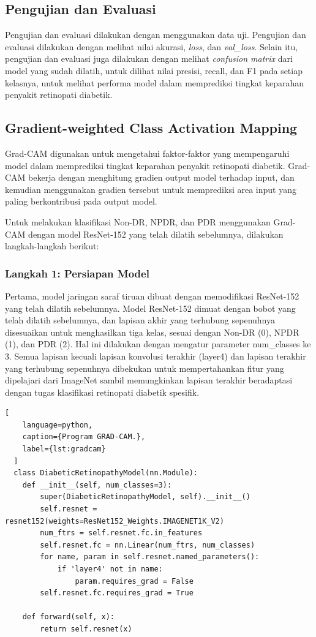 \subsection{Pengujian dan Evaluasi}
\label{sec:326}
Pengujian dan evaluasi dilakukan dengan menggunakan data uji. Pengujian dan evaluasi dilakukan dengan melihat nilai akurasi, \emph{loss}, dan \emph{val\_loss}. Selain itu, pengujian dan evaluasi juga dilakukan dengan melihat \emph{confusion matrix} dari model yang sudah dilatih, untuk dilihat nilai presisi, recall, dan F1 pada setiap kelasnya, untuk melihat performa model dalam memprediksi tingkat keparahan penyakit retinopati diabetik.

\subsection{Gradient-weighted Class Activation Mapping}
\label{sec:327}
Grad-CAM digunakan untuk mengetahui faktor-faktor yang mempengaruhi model dalam memprediksi tingkat keparahan penyakit retinopati diabetik. Grad-CAM bekerja dengan menghitung gradien output model terhadap input, dan kemudian menggunakan gradien tersebut untuk memprediksi area input yang paling berkontribusi pada output model.

Untuk melakukan klasifikasi Non-DR, NPDR, dan PDR menggunakan Grad-CAM dengan model ResNet-152 yang telah dilatih sebelumnya, dilakukan langkah-langkah berikut:

\subsubsection{Langkah 1: Persiapan Model}
Pertama, model jaringan saraf tiruan dibuat dengan memodifikasi ResNet-152 yang telah dilatih sebelumnya. 
Model ResNet-152 dimuat dengan bobot yang telah dilatih sebelumnya, dan lapisan akhir yang terhubung sepenuhnya disesuaikan untuk menghasilkan tiga kelas, sesuai dengan Non-DR (0), NPDR (1), dan PDR (2). 
Hal ini dilakukan dengan mengatur parameter num\_classes ke 3. 
Semua lapisan kecuali lapisan konvolusi terakhir (layer4) dan lapisan terakhir yang terhubung sepenuhnya dibekukan untuk mempertahankan fitur yang dipelajari dari ImageNet sambil memungkinkan lapisan terakhir beradaptasi dengan tugas klasifikasi retinopati diabetik spesifik. 

\begin{lstlisting}[
	language=python,
	caption={Program GRAD-CAM.},
	label={lst:gradcam}
  ]
  class DiabeticRetinopathyModel(nn.Module):
    def __init__(self, num_classes=3):
        super(DiabeticRetinopathyModel, self).__init__()
        self.resnet = resnet152(weights=ResNet152_Weights.IMAGENET1K_V2)
        num_ftrs = self.resnet.fc.in_features
        self.resnet.fc = nn.Linear(num_ftrs, num_classes)
        for name, param in self.resnet.named_parameters():
            if 'layer4' not in name:
                param.requires_grad = False
        self.resnet.fc.requires_grad = True

    def forward(self, x):
        return self.resnet(x)

\end{lstlisting}

